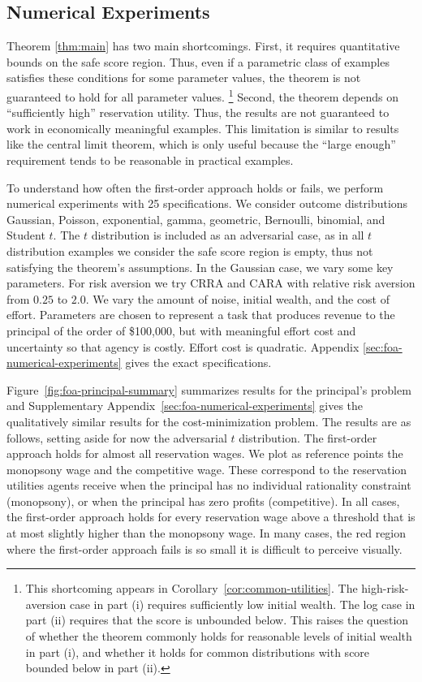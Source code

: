 \subsection{Numerical Experiments}
\label{sec:numerical-experiments}
Theorem \ref{thm:main} has two main shortcomings. First, it requires quantitative bounds on the safe score region. Thus, even if a parametric class of examples satisfies these conditions for some parameter values, the theorem is not guaranteed to hold for all parameter values.%
\footnote{%
This shortcoming appears in Corollary~\ref{cor:common-utilities}. The high-risk-aversion case in part (i) requires sufficiently low initial wealth. The log case in part (ii) requires that the score is unbounded below. This raises the question of whether the theorem commonly holds for reasonable levels of initial wealth in part (i), and whether it holds for common distributions with score bounded below in part (ii).}
Second, the theorem depends on ``sufficiently high'' reservation utility. Thus, the results are not guaranteed to work in economically meaningful examples. This limitation is similar to results like the central limit theorem, which is only useful because the ``large enough'' requirement tends to be reasonable in practical examples.

To understand how often the first-order approach holds or fails, we perform numerical experiments with 25 specifications. We consider outcome distributions Gaussian, Poisson, exponential, gamma, geometric, Bernoulli, binomial, and Student $t$. The $t$ distribution is included as an adversarial case, as in all $t$ distribution examples we consider the safe score region is empty, thus not satisfying the theorem's assumptions. In the Gaussian case, we vary some key parameters. For risk aversion we try CRRA and CARA with relative risk aversion from $0.25$ to $2.0$. We vary the amount of noise, initial wealth, and the cost of effort. Parameters are chosen to represent a task that produces revenue to the principal of the order of \$100,000, but with meaningful effort cost and uncertainty so that agency is costly. Effort cost is quadratic. Appendix \ref{sec:foa-numerical-experiments} gives the exact specifications.

Figure~\ref{fig:foa-principal-summary} summarizes results for the principal's problem and Supplementary Appendix~\ref{sec:foa-numerical-experiments} gives the qualitatively similar results for the cost-minimization problem. The results are as follows, setting aside for now the adversarial $t$ distribution. The first-order approach holds for almost all reservation wages. We plot as reference points the monopsony wage and the competitive wage. These correspond to the reservation utilities agents receive when the principal has no individual rationality constraint (monopsony), or when the principal has zero profits (competitive). In all cases, the first-order approach holds for every reservation wage above a threshold that is at most slightly higher than the monopsony wage. In many cases, the red region where the first-order approach fails is so small it is difficult to perceive visually.

